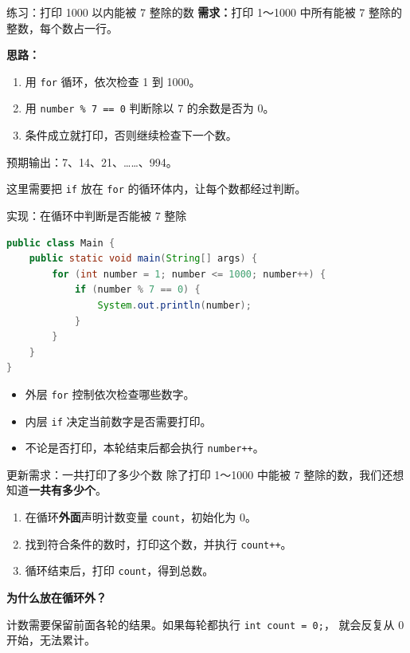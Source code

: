 \documentclass[aspectratio=169]{beamer}
\begin{document}
\begin{frame}{练习：打印 1000 以内能被 7 整除的数}
  \textbf{需求：}打印 1～1000 中所有能被 7 整除的整数，每个数占一行。
  \par\bigskip
  \textbf{思路：}
  \begin{enumerate}
    \item 用 \texttt{for} 循环，依次检查 1 到 1000。
    \item 用 \texttt{number \% 7 == 0} 判断除以 7 的余数是否为 0。
    \item 条件成立就打印，否则继续检查下一个数。
  \end{enumerate}
  \bigskip
  预期输出：7、14、21、……、994。
  \par\medskip
  这里需要把 \texttt{if} 放在 \texttt{for} 的循环体内，让每个数都经过判断。
\end{frame}

\begin{frame}[fragile]{实现：在循环中判断是否能被 7 整除}
  \begin{lstlisting}[language=Java]
public class Main {
    public static void main(String[] args) {
        for (int number = 1; number <= 1000; number++) {
            if (number % 7 == 0) {
                System.out.println(number);
            }
        }
    }
}
  \end{lstlisting}
  \begin{itemize}
    \item 外层 \texttt{for} 控制依次检查哪些数字。
    \item 内层 \texttt{if} 决定当前数字是否需要打印。
    \item 不论是否打印，本轮结束后都会执行 \texttt{number++}。
  \end{itemize}
\end{frame}

\begin{frame}{更新需求：一共打印了多少个数}
  除了打印 1～1000 中能被 7 整除的数，我们还想知道\textbf{一共有多少个}。
  \par\bigskip
  \begin{enumerate}
    \item 在循环\textbf{外面}声明计数变量 \texttt{count}，初始化为 0。
    \item 找到符合条件的数时，打印这个数，并执行 \texttt{count++}。
    \item 循环结束后，打印 \texttt{count}，得到总数。
  \end{enumerate}
  \bigskip
  \textbf{为什么放在循环外？}
  \par\medskip
  计数需要保留前面各轮的结果。如果每轮都执行 \texttt{int count = 0;}，
  就会反复从 0 开始，无法累计。
\end{frame}
\end{document}
